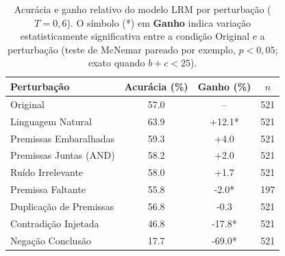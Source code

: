 \begin{table}[ht]
\centering
\caption{Acurácia e ganho relativo do modelo LRM por perturbação ($T=0{,}6$). O símbolo (*) em \textbf{Ganho} indica variação estatisticamente significativa entre a condição Original e a perturbação (teste de McNemar pareado por exemplo, $p<0{,}05$; exato quando $b+c<25$).}
\label{tab:lrm_perturbacoes}
\begin{tabular}{l
  S[table-format=2.1]
  S[table-format=-3.1, table-space-text-post={*}]
  S[table-format=3.0]
}
\toprule
\textbf{Perturbação} & {\textbf{Acurácia (\%)}} & {\textbf{Ganho (\%)}} & {\textbf{$n$}} \\
\midrule
Original & 57.0 & {--} & 521 \\
Linguagem Natural & 63.9 & +12.1* & 521 \\
Premissas Embaralhadas & 59.3 & +4.0 & 521 \\
Premissas Juntas (AND) & 58.2 & +2.0 & 521 \\
Ruído Irrelevante & 58.0 & +1.7 & 521 \\
Premissa Faltante & 55.8 & -2.0* & 197 \\
Duplicação de Premissas & 56.8 & -0.3 & 521 \\
Contradição Injetada & 46.8 & -17.8* & 521 \\
Negação Conclusão & 17.7 & -69.0* & 521 \\
\bottomrule
\end{tabular}
\end{table}